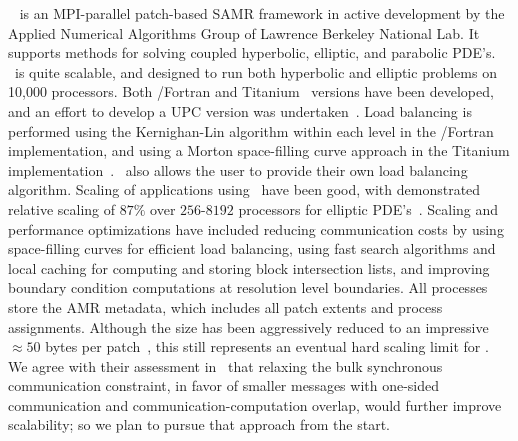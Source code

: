 \documentclass[11pt,letterpaper]{article}
\begin{document}

\SUBSUBSECTION{\chombo} 
%
\chombo~\cite{wwwchombo,CoGr09} is an MPI-parallel patch-based
SAMR framework in active development by the Applied Numerical
Algorithms Group of Lawrence Berkeley National Lab.  It supports
methods for solving coupled hyperbolic, elliptic, and parabolic PDE's.
\chombo\ is quite scalable, and designed to run both hyperbolic and
elliptic problems on 10,000 processors.  Both \cpp/Fortran and
Titanium~\cite{wwwtitanium,YeSe98} versions have been
developed, and an effort to develop a UPC version was
undertaken~\cite{We04}.  Load balancing is performed using the
Kernighan-Lin algorithm within each level in the \cpp/Fortran
implementation, and using a Morton space-filling curve approach in the
Titanium implementation~\cite{WeSu07}.  \chombo\ also allows the user
to provide their own load balancing algorithm.  Scaling of
applications using \chombo\ have been good, with demonstrated relative scaling
of $87\%$ over $256$-$8192$ processors for elliptic
PDE's~\cite{CoBe07}.  Scaling and performance optimizations have
included reducing communication costs by using space-filling curves
for efficient load balancing, using fast search algorithms and local
caching for computing and storing block intersection lists, and
improving boundary condition computations at resolution level
boundaries.  All processes store the AMR metadata, which includes all
patch extents and process assignments.  Although the size has been
aggressively reduced to an impressive $\approx 50$ bytes per
patch~\cite{CoBe07}, this still represents an eventual hard scaling
limit for \chombo.  We agree with their assessment in~\cite{WeSu07}
that relaxing the bulk synchronous communication constraint, in favor
of smaller messages with one-sided communication and
communication-computation overlap, would further improve scalability;
so we plan to pursue that approach from the start.

\end{document}
